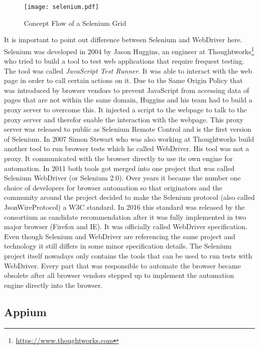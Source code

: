 \begin{figure}[htb]
  \centering
  \texttt{[image: selenium.pdf]}\\
  \caption{Concept Flow of a Selenium Grid}\label{fig:selenium}
\end{figure}

It is important to point out difference between Selenium and WebDriver here. Selenium was
developed in 2004 by Jason Huggins, an engineer at Thoughtworks\footnote{\url{https://www.thoughtworks.com}}
who tried to build a tool to test web applications that require frequest testing. The tool
was called \textit{JavaScript Test Runner}. It was able to interact with the web page in order
to call certain actions on it. Due to the Same Origin Policy that was introduced by browser
vendors to prevent JavaScript from accessing data of pages that are not within the same domain,
Huggins and his team had to build a proxy server to overcome this. It injected a script to the
webpage to talk to the proxy server and therefor enable the interaction with the webpage. This
proxy server was released to public as Selenium Remote Control and is the first version of
Selenium. In 2007 Simon Stewart who was also working at Thoughtworks build another tool to run
browser tests which he called WebDriver. His tool was not a proxy. It communicated with the
browser directly to use its own engine for automation. In 2011 both tools got merged into one
project that was called Selenium WebDriver (or Selenium 2.0). Over years it became the number
one choice of developers for browser automation so that originators and the community around
the project decided to make the Selenium protocol (also called JsonWireProtocol) a W3C standard.
In 2016 this standard was released by the consortium as candidate recommendation after it was
fully implemented in two major browser (Firefox and IE). It was officially called WebDriver
specification. Even though Selenium and WebDriver are referencing the same project and technology
it still differs in some minor specification details. The Selenium project itself nowadays only
contains the tools that can be used to run tests with WebDriver. Every part that was responsible
to automate the browser became obsolete after all browser vendors stepped up to implement the
automation engine directly into the browser.

\subsection{Appium\label{sec:appium}}

